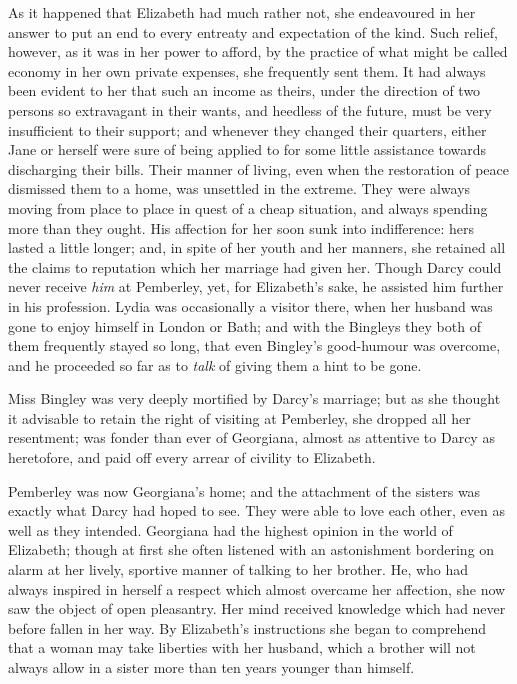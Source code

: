 As it happened that Elizabeth had much rather not, she endeavoured in her answer to put an end to every entreaty and expectation of the kind. Such relief, however, as it was in her power to afford, by the practice of what might be called economy in her own private expenses, she frequently sent them. It had always been evident to her that such an income as theirs, under the direction of two persons so extravagant in their wants, and heedless of the future, must be very insufficient to their support; and whenever they changed their quarters, either Jane or herself were sure of being applied to for some little assistance towards discharging their bills. Their manner of living, even when the restoration of peace dismissed them to a home, was unsettled in the extreme. They were always moving from place to place in quest of a cheap situation, and always spending more than they ought. His affection for her soon sunk into indifference: hers lasted a little longer; and, in spite of her youth and her manners, she retained all the claims to reputation which her marriage had given her. Though Darcy could never receive \textit{him} at Pemberley, yet, for Elizabeth's sake, he assisted him further in his profession. Lydia was occasionally a visitor there, when her husband was gone to enjoy himself in London or Bath; and with the Bingleys they both of them frequently stayed so long, that even Bingley's good-humour was overcome, and he proceeded so far as to \textit{talk} of giving them a hint to be gone.

Miss Bingley was very deeply mortified by Darcy's marriage; but as she thought it advisable to retain the right of visiting at Pemberley, she dropped all her resentment; was fonder than ever of Georgiana, almost as attentive to Darcy as heretofore, and paid off every arrear of civility to Elizabeth.

Pemberley was now Georgiana's home; and the attachment of the sisters was exactly what Darcy had hoped to see. They were able to love each other, even as well as they intended. Georgiana had the highest opinion in the world of Elizabeth; though at first she often listened with an astonishment bordering on alarm at her lively, sportive manner of talking to her brother. He, who had always inspired in herself a respect which almost overcame her affection, she now saw the object of open pleasantry. Her mind received knowledge which had never before fallen in her way. By Elizabeth's instructions she began to comprehend that a woman may take liberties with her husband, which a brother will not always allow in a sister more than ten years younger than himself.

